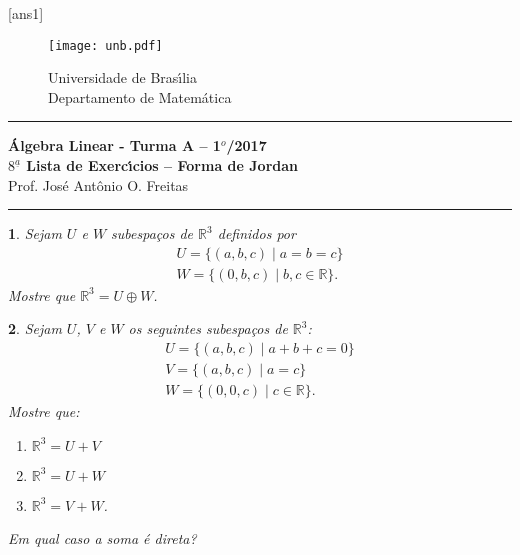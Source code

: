 \documentclass[12pt]{exam}
\newtheorem{exercicio}{}
\newcommand{\real}{\mathbb{R}}
\newcommand{\vesp}[1]{\vspace{ #1  cm}}
\begin{document}
\pagestyle{empty}

[ans1]

\begin{figure}[h]
        \begin{minipage}[c]{1.7cm}
        \texttt{[image: unb.pdf]}
        \end{minipage}%
        \hspace{0pt}
        \begin{minipage}[c]{4in}
          {Universidade de Bras{\'\i}lia} \\
          {Departamento de Matem{\'a}tica}
\end{minipage}
\end{figure}

\vesp{-0.35} \hrule

\begin{center}
{\Large\bf \'Algebra Linear - Turma A -- 1$^{o}$/2017} \\ \vspace{9pt} {\large\bf
  $8^{\underline{a}}$ Lista de Exerc{\'\i}cios -- Forma de Jordan}\\ \vspace{9pt} Prof. Jos{\'e} Ant{\^o}nio O. Freitas
\end{center}
\hrule

\vesp{.6}

\begin{exercicio}
  Sejam $U$ e $W$ subespa\c{c}os de $\real^3$ definidos por
  \begin{align*}
    U = \{(a,b,c) \mid a = b = c\}\\
    W = \{(0,b,c) \mid b, c \in \real\}.
  \end{align*}
  Mostre que $\real^3 = U \oplus W$.
\end{exercicio}

\begin{exercicio}
  Sejam $U$, $V$ e $W$ os seguintes subespa\c{c}os de $\real^3$:
  \begin{align*}
    U = \{(a,b,c) \mid a + b + c = 0\}\\
    V = \{(a,b,c) \mid a = c\}\\
    W = \{(0,0,c) \mid c \in \real\}.
  \end{align*}
  Mostre que:
  \begin{enumerate}[label=({\alph*})]
    \item $\real^3 = U + V$
    \item $\real^3 = U + W$
    \item $\real^3 = V + W$.
  \end{enumerate}
  Em qual caso a soma \'e direta?
\end{exercicio}
\end{document}
